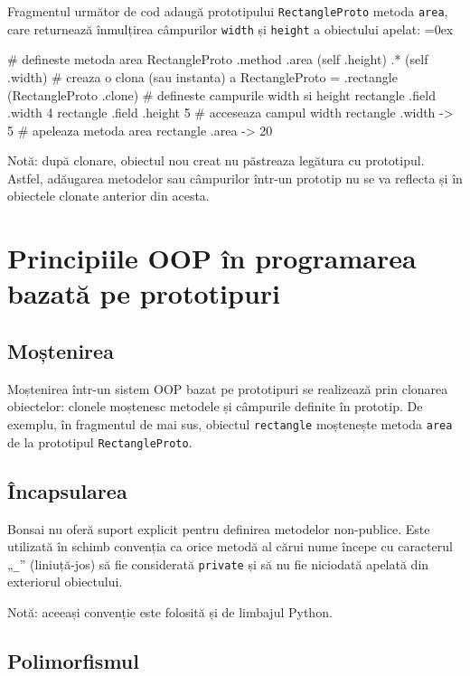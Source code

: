 \documentclass[12pt,a4paper]{memoir}
\renewcommand{\c}{\texttt}
\newenvironment{code}
{
\definecolor{shadecolor}{gray}{0.91}
\topsep=0ex
\relax
\shaded
\verbatim
}
{
\endverbatim
\endshaded
}
\begin{document}
Fragmentul următor de cod adaugă prototipului \c{RectangleProto} metoda \c{area}, care returnează înmulțirea câmpurilor \c{width} și \c{height} a obiectului apelat:
\begin{code}
# defineste metoda area 
RectangleProto .method .area { 
  (self .height) .* (self .width)
}
# creaza o clona (sau instanta) a RectangleProto
= .rectangle (RectangleProto .clone)
# defineste campurile width si height
rectangle .field .width 4
rectangle .field .height 5
# acceseaza campul width
rectangle .width
  -> 5
# apeleaza metoda area
rectangle .area
  -> 20
\end{code}

Notă: după clonare, obiectul nou creat nu păstreaza legătura cu prototipul. Astfel, adăugarea metodelor sau câmpurilor într-un prototip nu se va reflecta și în obiectele clonate anterior din acesta.

\section{Principiile OOP în programarea bazată pe prototipuri}

\subsection{Moștenirea}

Moștenirea într-un sistem OOP bazat pe prototipuri se realizează prin clonarea obiectelor: clonele moștenesc metodele și câmpurile definite în prototip. De exemplu, în fragmentul de mai sus, obiectul \c{rectangle} moștenește metoda \c{area} de la prototipul \c{RectangleProto}.

\subsection{Încapsularea}

Bonsai nu oferă suport explicit pentru definirea metodelor non-publice. Este utilizată în schimb convenția ca orice metodă al cărui nume începe cu caracterul „\c{\_}” (liniuță-jos) să fie considerată \c{private} și să nu fie niciodată apelată din exteriorul obiectului.

Notă: aceeași convenție este folosită și de limbajul Python\cite{python_classes}.

\subsection{Polimorfismul}
\end{document}
